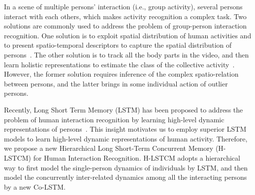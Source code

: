 \documentclass[9pt,journal,letterpaper,twocolumn]{IEEEtran}
\begin{document}
{		In a scene of multiple persons' interaction (i.e., group activity), several persons interact with each others, which makes activity recognition a complex task.  Two solutions are commonly used to address the problem of group-person interaction recognition. One solution is to exploit spatial distribution of human activities and to present spatio-temporal descriptors to
		capture the spatial distribution of persons~\cite{choi2009they,lan2012discriminative,DBLP:conf/cvpr/RyooA06}.  The other solution  is to  track all the body parts in the video, and then learn holistic representations to estimate the class of the collective activity~\cite{choi2012unified,vahdat2011discriminative}. However, the former solution requires inference of the complex spatio-relation between persons, and the latter brings in some individual action of outlier persons. 






		




		Recently, Long Short Term Memory (LSTM) has been proposed to address the problem of human interaction recognition by learning high-level dynamic  representations of persons~\cite{deng2015deep,deng2016structure,ke2016spatial}. This insight motivates us to employ superior LSTM models to learn high-level dynamic representations of human activity. Therefore, we propose a new Hierarchical Long Short-Term Concurrent Memory (H-LSTCM) for Human Interaction Recognition. H-LSTCM adopts a hierarchical way to first model the single-person dynamics of individuals by LSTM, and then model the concurrently inter-related dynamics among all the interacting persons by a new Co-LSTM. 
		
}
\end{document}
